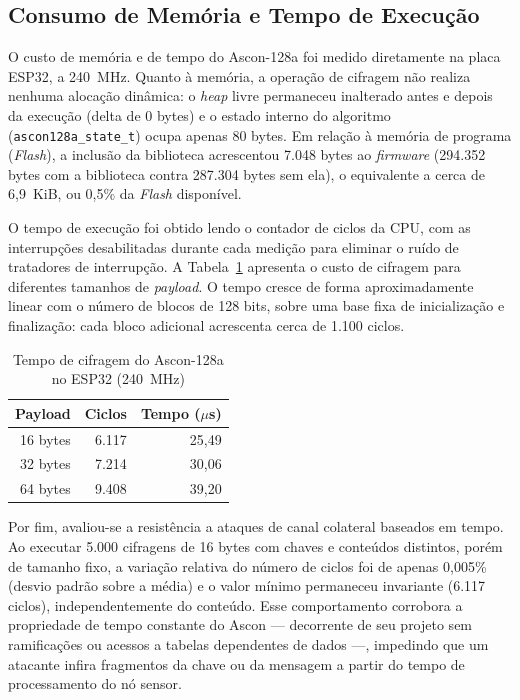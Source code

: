 
\subsection{Consumo de Memória e Tempo de Execução}

O custo de memória e de tempo do Ascon-128a foi medido diretamente na placa ESP32, a 240~MHz. Quanto à memória, a operação de cifragem não realiza nenhuma alocação dinâmica: o \textit{heap} livre permaneceu inalterado antes e depois da execução (delta de 0 bytes) e o estado interno do algoritmo (\texttt{ascon128a\_state\_t}) ocupa apenas 80 bytes. Em relação à memória de programa (\textit{Flash}), a inclusão da biblioteca acrescentou 7.048 bytes ao \textit{firmware} (294.352 bytes com a biblioteca contra 287.304 bytes sem ela), o equivalente a cerca de 6,9~KiB, ou 0,5\% da \textit{Flash} disponível.

O tempo de execução foi obtido lendo o contador de ciclos da CPU, com as interrupções desabilitadas durante cada medição para eliminar o ruído de tratadores de interrupção. A Tabela~\ref{tab:tempo_ascon128a} apresenta o custo de cifragem para diferentes tamanhos de \textit{payload}. O tempo cresce de forma aproximadamente linear com o número de blocos de 128 bits, sobre uma base fixa de inicialização e finalização: cada bloco adicional acrescenta cerca de 1.100 ciclos.

\begin{table}[htb]
\centering
\caption{Tempo de cifragem do Ascon-128a no ESP32 (240~MHz)}
\label{tab:tempo_ascon128a}
\begin{tabular}{rrr}
\hline
\textbf{Payload} & \textbf{Ciclos} & \textbf{Tempo ($\mu$s)} \\
\hline
16 bytes & 6.117 & 25,49 \\
32 bytes & 7.214 & 30,06 \\
64 bytes & 9.408 & 39,20 \\
\hline
\end{tabular}
\end{table}

Por fim, avaliou-se a resistência a ataques de canal colateral baseados em tempo. Ao executar 5.000 cifragens de 16 bytes com chaves e conteúdos distintos, porém de tamanho fixo, a variação relativa do número de ciclos foi de apenas 0,005\% (desvio padrão sobre a média) e o valor mínimo permaneceu invariante (6.117 ciclos), independentemente do conteúdo. Esse comportamento corrobora a propriedade de tempo constante do Ascon — decorrente de seu projeto sem ramificações ou acessos a tabelas dependentes de dados —, impedindo que um atacante infira fragmentos da chave ou da mensagem a partir do tempo de processamento do nó sensor.

